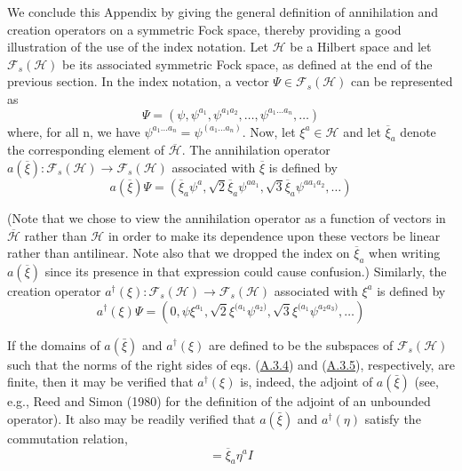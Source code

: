 \documentclass[11pt,a4paper]{article}
\begin{document}
We conclude this Appendix by giving the general definition of annihilation and creation operators on a symmetric Fock space, thereby providing a good illustration of the use of the index notation. Let \(\mathcal{H}\) be a Hilbert space and let \(\mathcal{F}_s(\mathcal{H})\) be its associated symmetric Fock space, as defined at the end of the previous section. In the index notation, a vector \(\Psi \in \mathcal{F}_s(\mathcal{H})\) can be represented as
\begin{equation*}
\Psi = (\psi, \psi^{a_1}, \psi^{a_1 a_2}, \dots, \psi^{a_1 \dots a_n}, \dots) \tag{A.3.3}\label{eq:A.3.3}
\end{equation*}
where, for all n, we have \(\psi^{a_1...a_n} = \psi^{(a_1...a_n)}\). Now, let \(\xi^a \in \mathcal{H}\) and let \(\overline{\xi}_a\) denote the corresponding element of \(\overline{\mathcal{H}}\). The annihilation operator \(a(\overline{\xi}): \mathcal{F}_s(\mathcal{H}) \to \mathcal{F}_s(\mathcal{H})\) associated with \(\overline{\xi}\) is defined by
\begin{equation*}
a(\overline{\xi})\Psi = \left(\overline{\xi}_a \psi^a, \sqrt{2} \overline{\xi}_a \psi^{aa_1}, \sqrt{3} \overline{\xi}_a \psi^{aa_1a_2}, \dots\right) \tag{A.3.4}\label{eq:A.3.4}
\end{equation*}

(Note that we chose to view the annihilation operator as a function of vectors in \(\overline{\mathcal{H}}\) rather than \(\mathcal{H}\) in order to make its dependence upon these vectors be linear rather than antilinear. Note also that we dropped the index on \(\overline{\xi}_a\) when writing \(a(\overline{\xi})\) since its presence in that expression could cause confusion.) Similarly, the creation operator \(a^{\dagger}(\xi):\mathcal{F}_s(\mathcal{H})\to\mathcal{F}_s(\mathcal{H})\) associated with \(\xi^a\) is defined by
\begin{equation*}
a^{\dagger}(\xi)\Psi=(0,\psi\xi^{a_1},\sqrt2 \xi^{(a_1}\psi^{a_2)},\sqrt3 \xi^{(a_1}\psi^{a_2a_3)},\ldots) \tag{A.3.5}\label{eq:A.3.5}
\end{equation*}

If the domains of \(a(\bar{\xi})\) and \(a^{\dagger}(\xi)\) are defined to be the subspaces of \(\mathcal{F}_s(\mathcal{H})\) such that the norms of the right sides of eqs. (\hyperref[eq:A.3.4]{A.3.4}) and (\hyperref[eq:A.3.5]{A.3.5}), respectively, are finite, then it may be verified that \(a^{\dagger}(\xi)\) is, indeed, the adjoint of \(a(\bar{\xi})\) (see, e.g., Reed and Simon (1980) for the definition of the adjoint of an unbounded operator). It also may be readily verified that \(a(\bar{\xi})\) and \(a^{\dagger}(\eta)\) satisfy the commutation relation,
\begin{equation*}
[a(\overline{\xi}),a^{\dagger}(\eta)] = \overline{\xi}_a \eta^a I \tag{A.3.6}\label{eq:A.3.6}
\end{equation*}
\end{document}
